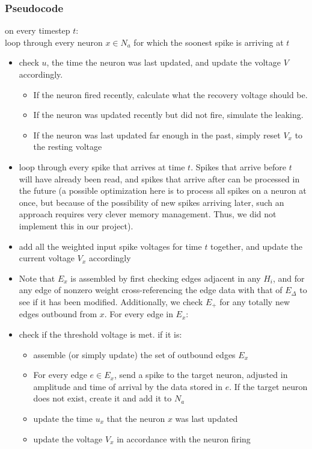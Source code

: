\documentclass{article}
\begin{document}
\newpage

\subsubsection{Pseudocode}
on every timestep $t$:
\vspace{5mm} \\
loop through every neuron $x \in N_a$ for which the soonest spike is arriving at $t$
\begin{itemize}
    \item check $u$, the time the neuron was last updated, and update the voltage $V$ accordingly. 
    \begin{itemize}
        \item If the neuron fired recently, calculate what the recovery voltage should be. 
        \item If the neuron was updated recently but did not fire, simulate the leaking. 
        \item If the neuron was last updated far enough in the past, simply reset $V_x$ to the resting voltage
    \end{itemize} 
    \item loop through every spike that arrives at time $t$. Spikes that arrive before $t$ will have already been read, and spikes that arrive after can be processed in the future (a possible optimization here is to process all spikes on a neuron at once, but because of the possibility of new spikes arriving later, such an approach requires very clever memory management. Thus, we did not implement this in our project).
    \item add all the weighted input spike voltages for time $t$ together, and update the current voltage $V_x$ accordingly
    \item Note that $E_x$ is assembled by first checking edges adjacent in any $H_i$, and for any edge of nonzero weight cross-referencing the edge data with that of $E_\Delta$ to see if it has been modified. Additionally, we check $E_+$ for any totally new edges outbound from $x$. For every edge in $E_x$:
    \item check if the threshold voltage is met. if it is:
    \begin{itemize}
        \item assemble (or simply update) the set of outbound edges $E_x$
        \item For every edge $e \in E_x$, send a spike to the target neuron, adjusted in amplitude and time of arrival by the data stored in $e$. If the target neuron does not exist, create it and add it to $N_a$
        \item update the time $u_x$ that the neuron $x$ was last updated
        \item update the voltage $V_x$ in accordance with the neuron firing
    \end{itemize}
\end{itemize}
\end{document}

